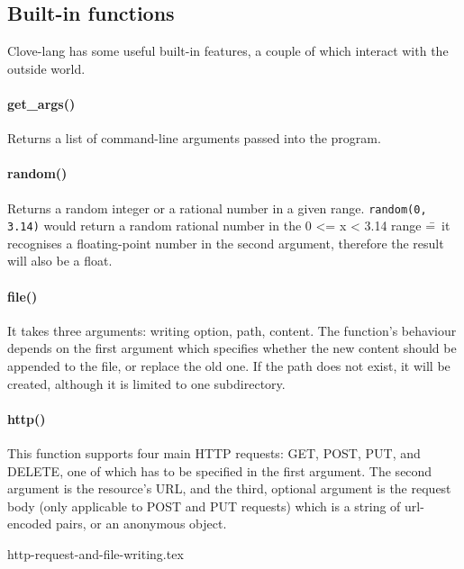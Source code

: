 \documentclass[12pt,a4paper]{article}
\begin{document}
\vspace{-1.5em}
\subsection*{Built-in functions}
Clove-lang has some useful built-in features, a couple of which interact with the outside world.

\paragraph*{get\_args()}
Returns a list of command-line arguments passed into the program.

\vspace{-0.75em}
\paragraph*{random()}
Returns a random integer or a rational number in a given range. \texttt{random(0, 3.14)} would return a random rational number in the 0 <= x < 3.14 range \==~it recognises a floating-point number in the second argument, therefore the result will also be a float.

\vspace{-0.75em}
\paragraph*{file()}
It takes three arguments: writing option, path, content. The function's behaviour depends on the first argument which specifies whether the new content should be appended to the file, or replace the old one. If the path does not exist, it will be created, although it is limited to one subdirectory.

\vspace{-0.75em}
\paragraph*{http()}
This function supports four main HTTP requests: GET, POST, PUT, and DELETE, one of which has to be specified in the first argument. The second argument is the resource's URL, and the third, optional argument is the request body (only applicable to POST and PUT requests) which is a string of url-encoded pairs, or an anonymous object.

{http-request-and-file-writing.tex}
\end{document}
